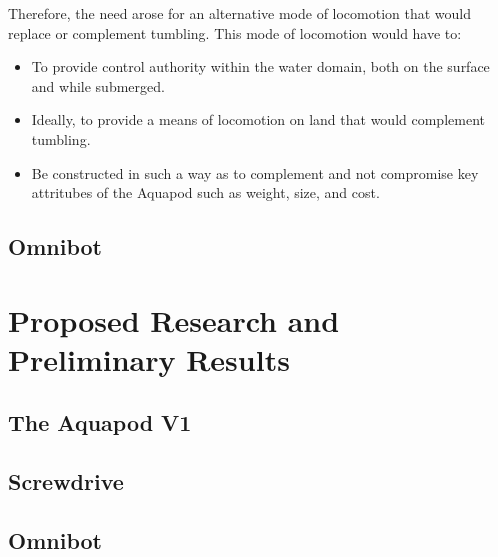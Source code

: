 Therefore, the need arose for an alternative mode of locomotion that would replace or complement tumbling. This mode of locomotion would have to:

\begin{itemize}
	\item To provide control authority within the water domain, both on the surface and while submerged.  
	\item Ideally, to provide a means of locomotion on land that would complement tumbling.  
	\item Be constructed in such a way as to complement and not compromise key attritubes of the Aquapod such as weight, size, and cost. 
\end{itemize}
	

\subsection{Omnibot}


\section{Proposed Research and Preliminary Results}

\subsection{The Aquapod V1}

\subsection{Screwdrive}

\subsection{Omnibot}
\label{sec:omnibot}





